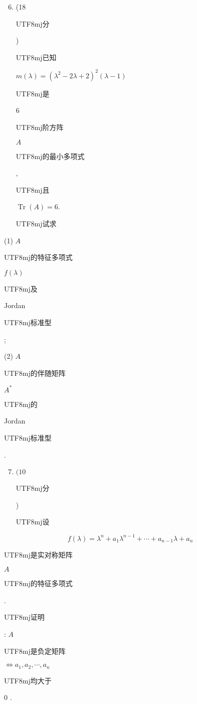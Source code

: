 \documentclass[10pt]{article}
\begin{document}
\begin{enumerate}
  \setcounter{enumi}{5}
  \item (18 \begin{CJK}{UTF8}{mj}分\end{CJK}) \begin{CJK}{UTF8}{mj}已知\end{CJK} $m(\lambda)=\left(\lambda^{2}-2 \lambda+2\right)^{2}(\lambda-1)$ \begin{CJK}{UTF8}{mj}是\end{CJK} 6 \begin{CJK}{UTF8}{mj}阶方阵\end{CJK} $A$ \begin{CJK}{UTF8}{mj}的最小多项式\end{CJK}, \begin{CJK}{UTF8}{mj}且\end{CJK} $\operatorname{Tr}(A)=6$. \begin{CJK}{UTF8}{mj}试求\end{CJK}
\end{enumerate}
(1) $A$ \begin{CJK}{UTF8}{mj}的特征多项式\end{CJK} $f(\lambda)$ \begin{CJK}{UTF8}{mj}及\end{CJK} Jordan \begin{CJK}{UTF8}{mj}标准型\end{CJK};

(2) $A$ \begin{CJK}{UTF8}{mj}的伴随矩阵\end{CJK} $A^{*}$ \begin{CJK}{UTF8}{mj}的\end{CJK} Jordan \begin{CJK}{UTF8}{mj}标准型\end{CJK}.

\begin{enumerate}
  \setcounter{enumi}{6}
  \item $(10$ \begin{CJK}{UTF8}{mj}分\end{CJK}) \begin{CJK}{UTF8}{mj}设\end{CJK}
\end{enumerate}
$$
f(\lambda)=\lambda^{n}+a_{1} \lambda^{n-1}+\cdots+a_{n-1} \lambda+a_{n}
$$
\begin{CJK}{UTF8}{mj}是实对称矩阵\end{CJK} $A$ \begin{CJK}{UTF8}{mj}的特征多项式\end{CJK}. \begin{CJK}{UTF8}{mj}证明\end{CJK}: $A$ \begin{CJK}{UTF8}{mj}是负定矩阵\end{CJK} $\Leftrightarrow a_{1}, a_{2}, \cdots, a_{n}$ \begin{CJK}{UTF8}{mj}均大于\end{CJK} 0 .
\end{document}
